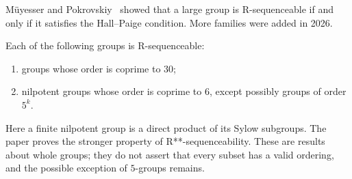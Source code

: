 M\"uyesser and Pokrovskiy~\cite{mp22} showed that a large group is R-sequenceable if and only if it satisfies the Hall--Paige condition. More families were added in 2026.

\begin{theorem}\label{thm:psr}
Each of the following groups is R-sequenceable:
\begin{enumerate}
\item groups whose order is coprime to $30$;
\item nilpotent groups whose order is coprime to $6$, except possibly groups of order $5^k$.
\end{enumerate}
\end{theorem}

Here a finite nilpotent group is a direct product of its Sylow subgroups. The paper proves the stronger property of R**-sequenceability. These are results about whole groups; they do not assert that every subset has a valid ordering, and the possible exception of $5$-groups remains.
